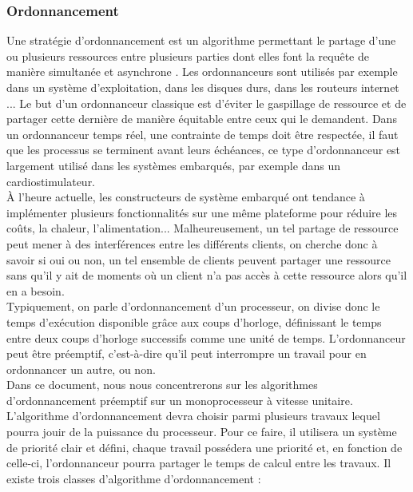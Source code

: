\documentclass[a4paper]{report}
\theoremstyle{break}
\theoremstyle{breakplain}
\begin{document}
\subsubsection{Ordonnancement}
Une stratégie d'ordonnancement est un algorithme permettant le partage d'une ou plusieurs ressources entre plusieurs parties dont elles font la requête de manière simultanée et asynchrone \cite{goossens2014os}. Les ordonnanceurs sont utilisés par exemple dans un système d'exploitation, dans les disques durs, dans les routeurs internet ... Le but d'un ordonnanceur classique est d'éviter le gaspillage de ressource et de partager cette dernière de manière équitable entre ceux qui le demandent. Dans un ordonnanceur temps réel, une contrainte de temps doit être respectée, il faut que les processus se terminent avant leurs échéances, ce type d'ordonnanceur est largement utilisé dans les systèmes embarqués, par exemple dans un cardiostimulateur.\\

À l'heure actuelle, les constructeurs de système embarqué ont tendance à implémenter plusieurs fonctionnalités sur une même plateforme pour réduire les coûts, la chaleur, l'alimentation... Malheureusement, un tel partage de ressource peut mener à des interférences entre les différents clients, on cherche donc à savoir si oui ou non, un tel ensemble de clients peuvent partager une ressource sans qu'il y ait de moments où un client n'a pas accès à cette ressource alors qu'il en a besoin.\\
Typiquement, on parle d'ordonnancement d'un processeur, on divise donc le temps d'exécution disponible grâce aux coups d'horloge, définissant le temps entre deux coups d'horloge successifs comme une unité de temps. L'ordonnanceur peut être préemptif, c'est-à-dire qu'il peut interrompre un travail pour en ordonnancer un autre, ou non.\\

Dans ce document, nous nous concentrerons sur les algorithmes d'ordonnancement préemptif sur un monoprocesseur à vitesse unitaire.\\

L'algorithme d'ordonnancement devra choisir parmi plusieurs travaux lequel pourra jouir de la puissance du processeur.  Pour ce faire, il utilisera un système de priorité clair et défini, chaque travail possédera une priorité et, en fonction de celle-ci, l'ordonnanceur pourra partager le temps de calcul entre les travaux. Il existe trois classes d'algorithme d'ordonnancement \cite{goossens2014os} :
\end{document}

